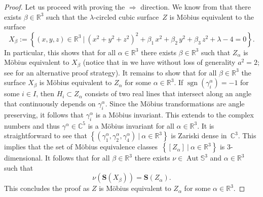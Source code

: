 \documentclass[11pt]{article}
\newcommand{\C}{\mathbb{C}}
\newcommand{\R}{\mathbb{R}}
\renewcommand{\S}{\mathbb{S}}
\newcommand{\bS}{\mathbf{S}}
\newcommand{\aut}{\operatorname{Aut}}
\newcommand{\set}[2]{\left\{#1 ~|~ #2\right\}}
\newcommand{\sgn}{\operatorname{sgn}}
\newcommand{\Wlog}{without loss of generality }
\newcommand{\st}{such that }
\begin{document}
\begin{proof}
Let us proceed with proving the $\Rightarrow$ direction.
We know from \citep[Theorem~6.6 with Propositions~3.2 and~4.2]{2000}
that there exists $\beta\in\R^3$ \st the $\lambda$-circled cubic surface~$Z$ is M\"obius equivalent to the surface
\[
X_\beta:=\set{(x,y,z)\in\R^3}{(x^2+y^2+z^2)^2+\beta_1\,x^2+\beta_2\,y^2+\beta_3\,z^2+\lambda-4=0}.
\]
In particular, this shows that
for all $\alpha\in\R^3$
there exists $\beta\in\R^3$ \st $Z_\alpha$ is M\"obius equivalent
to $X_\beta$
(notice that in \cite{2000} we have \Wlog $a^2=2$;
see \citep[Remark~32]{2023trans} for an alternative proof strategy).
It remains to show that for all $\beta\in\R^3$
the surface $X_\beta$ is M\"obius equivalent to $Z_\alpha$ for some $\alpha\in\R^3$.
If $\sgn(\gamma^\alpha_i)=-1$ for some $i\in I$,
then $H_i\subset Z_\alpha$ consists of two real lines
that intersect along an angle that continuously depends on $\gamma^\alpha_i$.
Since the M\"obius transformations are angle preserving,
it follows that $\gamma^\alpha_i$ is a M\"obius invariant.
This extends to the complex numbers and thus $\gamma^\alpha\in\C^5$ is a M\"obius invariant for all $\alpha\in\R^3$.
It is straightforward to see that $\set{(\gamma^\alpha_1,\gamma^\alpha_2,\gamma^\alpha_4)}{\alpha\in \R^3}$
is Zariski dense in~$\C^3$.
This implies that the set of M\"obius equivalence classes~$\set{[Z_\alpha]}{\alpha\in \R^3}$
is 3-dimensional.
It follows that for all $\beta\in\R^3$ there exists $\nu\in \aut\S^3$ and $\alpha\in\R^3$ \st
\[
\nu(\bS(X_\beta))=\bS(Z_\alpha).
\]
This concludes the proof as $Z$ is M\"obius equivalent to $Z_\alpha$ for some $\alpha\in\R^3$.
\end{proof}
\end{document}
